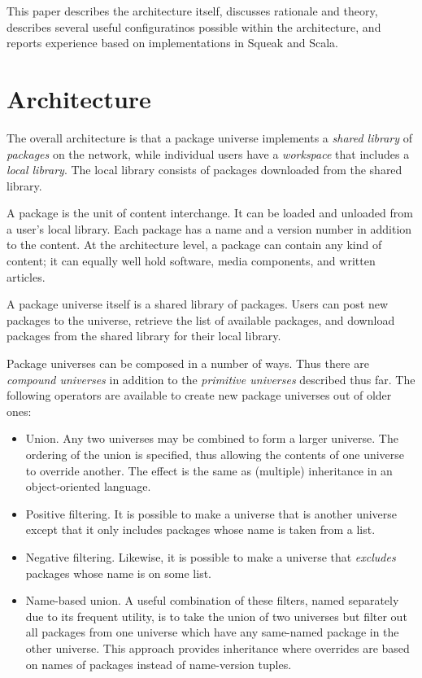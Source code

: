 \documentclass{IEEEtran}
\begin{document}
This paper describes the architecture itself, discusses rationale and
theory, describes several useful configuratinos possible within the
architecture, and reports experience based on implementations in
Squeak and Scala.


\section{Architecture}
The overall architecture is that a package universe implements a
\emph{shared library} of \emph{packages} on the network, while
individual users have a \emph{workspace} that includes a \emph{local
library}.  The local library consists of packages downloaded from the
shared library.

A package is the unit of content interchange.  It can be loaded and
unloaded from a user's local library.  Each package has a name and a
version number in addition to the content.  At the architecture level,
a package can contain any kind of content; it can equally well hold
software, media components, and written articles.


A package universe itself is a shared library of packages.  Users can
post new packages to the universe, retrieve the list of available
packages, and download packages from the shared library for their
local library.


Package universes can be composed in a number of ways.  Thus there are
\emph{compound universes} in addition to the \emph{primitive
universes} described thus far.  The following operators are available to
create new package universes out of older ones:
\begin{itemize}
\item Union.  Any two universes may be combined to form a larger
      universe.  The ordering of the union is specified, thus allowing
      the contents of one universe to override another.  The effect
      is the same as (multiple) inheritance in an object-oriented language.

\item Positive filtering.  It is possible to make a universe that is
      another universe except that it only includes packages whose name
      is taken from a list.

\item Negative filtering.  Likewise, it is possible to make a universe
      that \emph{excludes} packages whose name is on some list.

\item Name-based union.  A useful combination of these filters, named
      separately due to its frequent utility, is to take the union of
      two universes but filter out all packages from one universe
      which have any same-named package in the other universe.  This
      approach provides inheritance where overrides are based on names
      of packages instead of name-version tuples.
\end{itemize}
\end{document}
